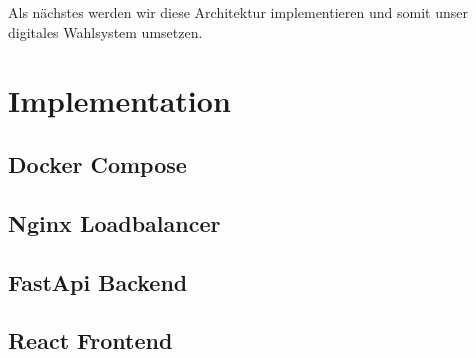 \documentclass{article}  %
\begin{document}
Als nächstes werden wir diese Architektur implementieren und somit unser digitales Wahlsystem umsetzen.



\newpage
\section{Implementation}
\subsection{Docker Compose}
\subsection{Nginx Loadbalancer}
\subsection{FastApi Backend}
\subsection{React Frontend}
\newpage
\end{document}

